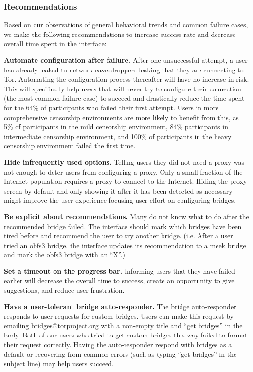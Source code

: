 \documentclass[USenglish,oneside,twocolumn]{article}
\begin{document}
\subsubsection{Recommendations}
\label{recommendations}
Based on our observations of general behavioral trends and common failure cases, we make the following recommendations to increase success rate and decrease overall time spent in the interface: \\

\begin{description}
\item {\bfseries Automate configuration after failure.} After one unsuccessful attempt, a user has already leaked to network eavesdroppers leaking that they are connecting to Tor. Automating the configuration process thereafter will have no increase in risk. This will specifically help users that will never try to configure their connection (the most common failure case) to succeed and drastically reduce the time spent for the 64\% of participants who failed their first attempt. Users in more comprehensive censorship environments are more likely to benefit from this, as 5\% of participants in the mild censorship environment, 84\% participants in intermediate censorship environment, and 100\% of participants in the heavy censorship environment failed the first time.
\item{\bfseries Hide infrequently used options.} Telling users they did not need a proxy was not enough to deter users from configuring a proxy. Only a small fraction of the Internet population requires a proxy to connect to the Internet. Hiding the proxy screen by default and only showing it after it has been detected as necessary might improve the user experience focusing user effort on configuring bridges.
\item {\bfseries Be explicit about recommendations.} Many do not know what to do after the recommended bridge failed. The interface should mark which bridges have been tired before and recommend the user to try another bridge. (i.e. After a user tried an obfs3 bridge, the interface updates its recommendation to a meek bridge and mark the obfs3 bridge with an ``X''.)
\item{\bfseries Set a timeout on the progress bar.} Informing users that they have failed earlier will decrease the overall time to success, create an opportunity to give suggestions, and reduce user frustration. 
\item{\bfseries Have a user-tolerant bridge auto-responder.} The bridge auto-responder responds to user requests for custom bridges. Users can make this request by emailing bridges@torproject.org with a non-empty title and ``get bridges'' in the body. Both of our users who tried to get custom bridges this way failed to format their request correctly. Having the auto-responder respond with bridges as a default or recovering from common errors (such as typing ``get bridges'' in the subject line) may help users succeed. 
\end{description} 
\end{document}
